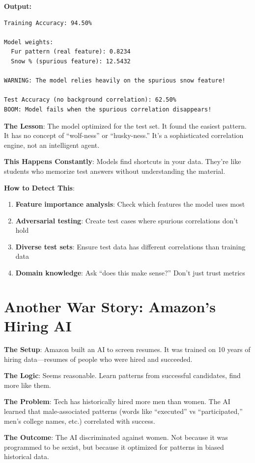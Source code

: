 \textbf{Output:}
\begin{verbatim}
Training Accuracy: 94.50%

Model weights:
  Fur pattern (real feature): 0.8234
  Snow % (spurious feature): 12.5432

WARNING: The model relies heavily on the spurious snow feature!

Test Accuracy (no background correlation): 62.50%
BOOM: Model fails when the spurious correlation disappears!
\end{verbatim}

\textbf{The Lesson}: The model optimized for the test set. It found the easiest pattern. It has no concept of ``wolf-ness'' or ``husky-ness.'' It's a sophisticated correlation engine, not an intelligent agent.

\textbf{This Happens Constantly}: Models find shortcuts in your data. They're like students who memorize test answers without understanding the material.

\textbf{How to Detect This}:
\begin{enumerate}
\item \textbf{Feature importance analysis}: Check which features the model uses most
\item \textbf{Adversarial testing}: Create test cases where spurious correlations don't hold
\item \textbf{Diverse test sets}: Ensure test data has different correlations than training data
\item \textbf{Domain knowledge}: Ask ``does this make sense?'' Don't just trust metrics
\end{enumerate}

\section{Another War Story: Amazon's Hiring AI}

\textbf{The Setup}: Amazon built an AI to screen resumes. It was trained on 10 years of hiring data---resumes of people who were hired and succeeded.

\textbf{The Logic}: Seems reasonable. Learn patterns from successful candidates, find more like them.

\textbf{The Problem}: Tech has historically hired more men than women. The AI learned that male-associated patterns (words like ``executed'' vs ``participated,'' men's college names, etc.) correlated with success.

\textbf{The Outcome}: The AI discriminated against women. Not because it was programmed to be sexist, but because it optimized for patterns in biased historical data.

